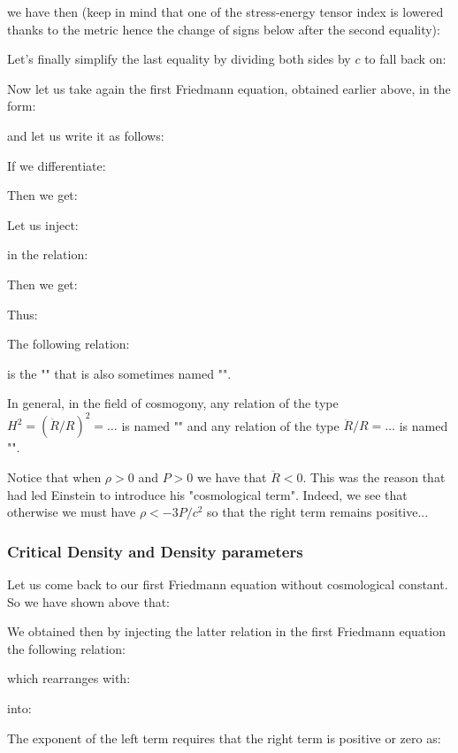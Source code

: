 	we have then (keep in mind that one of the stress-energy tensor index is lowered thanks to the metric hence the change of signs below after the second equality):
	
	Let's finally simplify the last equality by dividing both sides by $c$ to fall back on:
	
	Now let us take again the first Friedmann equation, obtained earlier above, in the form:
	
	and let us write it as follows:
	
	If we differentiate:
	
	Then we get:
	
	Let us inject:
	
	in the relation:
	
	Then we get:
	
	Thus:
	
	The following relation:
	
	is the "" that is also sometimes named "".
	
	In general, in the field of cosmogony, any relation of the type $H^2=(\dot{R}/R)^2=\ldots$ is named "" and any relation of the type $\ddot{R}/R=\ldots$  is named "".
	
	\begin{tcolorbox}[title=Remarks,colframe=black,arc=10pt]
	 Notice that when $\rho>0$ and $P>0$ we have that $\ddot{R}<0$. This was the reason that had led Einstein to introduce his "cosmological term". Indeed, we see that otherwise we must have $\rho< -3P/c^2$ so that the right term remains positive...
	\end{tcolorbox}
		
	\subsubsection{Critical Density and Density parameters}\label{critical density}
	Let us come back to our first Friedmann equation without cosmological constant. So we have shown above that:
	
	We obtained then by injecting the latter relation in the first Friedmann equation the following relation:
	
	which rearranges with:
	
	into:
	
	The exponent of the left term requires that the right term is positive or zero as:
	
